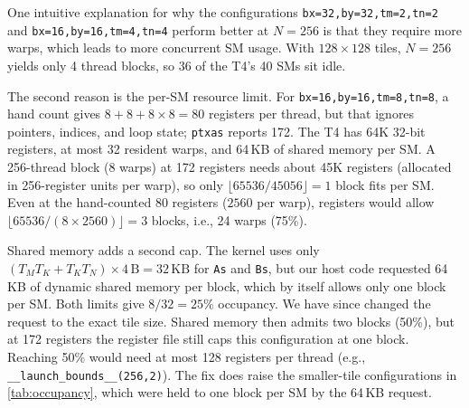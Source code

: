 \documentclass[letterpaper,twocolumn,10pt]{article}
\begin{document}
One intuitive explanation for why the configurations \texttt{bx=32,by=32,tm=2,tn=2}
and \texttt{bx=16,by=16,tm=4,tn=4} perform better at $N=256$ is that they require more
warps, which leads to more concurrent SM usage. With $128\times128$ tiles, $N=256$
yields only 4 thread blocks, so 36 of the T4's 40 SMs sit idle.

The second reason is the per-SM resource limit. For
\texttt{bx=16,by=16,tm=8,tn=8}, a hand count gives $8 + 8 + 8\times8 = 80$ registers
per thread, but that ignores pointers, indices, and loop state; \texttt{ptxas}
reports 172. The T4 has 64K 32-bit registers, at most 32 resident warps, and 64\,KB
of shared memory per SM. A 256-thread block (8 warps) at 172 registers needs about
45K registers (allocated in 256-register units per warp), so only
$\lfloor 65536/45056 \rfloor = 1$ block fits per SM. Even at the hand-counted 80
registers ($2560$ per warp), registers would allow
$\lfloor 65536/(8\times2560) \rfloor = 3$ blocks, i.e., 24 warps (75\%).

Shared memory adds a second cap. The kernel uses only
$(T_M T_K + T_K T_N)\times4\,\text{B} = 32\,\text{KB}$ for \texttt{As} and
\texttt{Bs}, but our host code requested 64\,KB of dynamic shared memory per block,
which by itself allows only one block per SM. Both limits give
$8/32 = 25\%$ occupancy. We have since changed the request to the exact tile size.
Shared memory then admits two blocks (50\%), but at 172 registers the register
file still caps this configuration at one block. Reaching 50\% would need at most
128 registers per thread (e.g., \texttt{\_\_launch\_bounds\_\_(256,2)}). The fix does
raise the smaller-tile configurations in \cref{tab:occupancy}, which were held to
one block per SM by the 64\,KB request.
\end{document}
